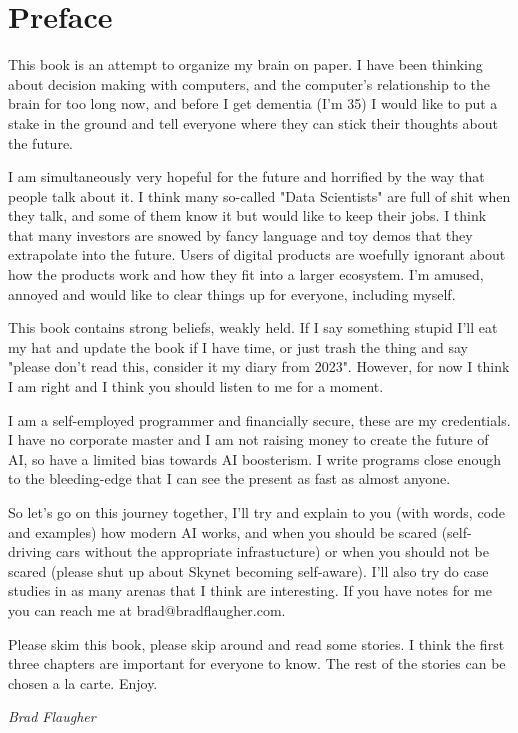 \chapter*{Preface}

This book is an attempt to organize my brain on paper. I have been thinking about decision making with computers, and the computer's relationship to the brain for too long now, and before I get dementia (I'm 35) I would like to put a stake in the ground and tell everyone where they can stick their thoughts about the future. 

I am simultaneously very hopeful for the future and horrified by the way that people talk about it. I think many so-called "Data Scientists" are full of shit when they talk, and some of them know it but would like to keep their jobs. I think that many investors are snowed by fancy language and toy demos that they extrapolate into the future. Users of digital products are woefully ignorant about how the products work and how they fit into a larger ecosystem. I'm amused, annoyed and would like to clear things up for everyone, including myself.

This book contains strong beliefs, weakly held. If I say something stupid I'll eat my hat and update the book if I have time, or just trash the thing and say "please don't read this, consider it my diary from 2023". However, for now I think I am right and I think you should listen to me for a moment.

I am a self-employed programmer and financially secure, these are my credentials. I have no corporate master and I am not raising money to create the future of AI, so have a limited bias towards AI boosterism. I write programs close enough to the bleeding-edge that I can see the present as fast as almost anyone.

So let's go on this journey together, I'll try and explain to you (with words, code and examples) how modern AI works, and when you should be scared (self-driving cars without the appropriate infrastucture) or when you should not be scared (please shut up about Skynet becoming self-aware). I'll also try do case studies in as many arenas that I think are interesting. If you have notes for me you can reach me at brad@bradflaugher.com.

Please skim this book, please skip around and read some stories. I think the first three chapters are important for everyone to know. The rest of the stories can be chosen a la carte. Enjoy.

\begin{flushright}
	\textit{Brad Flaugher}
\end{flushright}
